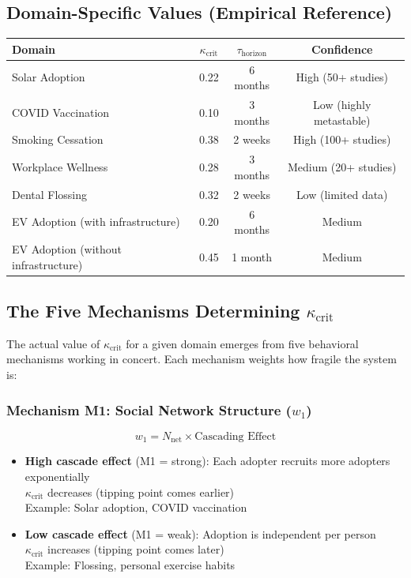 \documentclass[11pt, a4paper]{article}
\begin{document}
\subsection{Domain-Specific Values (Empirical Reference)}

\begin{center}
\begin{tabular}{|l|c|c|c|}
\hline
\textbf{Domain} & $\kappa_{\text{crit}}$ & \textbf{$\tau_{\text{horizon}}$} & \textbf{Confidence} \\
\hline
Solar Adoption & 0.22 & 6 months & High (50+ studies) \\
COVID Vaccination & 0.10 & 3 months & Low (highly metastable) \\
Smoking Cessation & 0.38 & 2 weeks & High (100+ studies) \\
Workplace Wellness & 0.28 & 3 months & Medium (20+ studies) \\
Dental Flossing & 0.32 & 2 weeks & Low (limited data) \\
EV Adoption (with infrastructure) & 0.20 & 6 months & Medium \\
EV Adoption (without infrastructure) & 0.45 & 1 month & Medium \\
\hline
\end{tabular}
\end{center}

\subsection{The Five Mechanisms Determining $\kappa_{\text{crit}}$}

The actual value of $\kappa_{\text{crit}}$ for a given domain emerges from five behavioral
mechanisms working in concert. Each mechanism weights how fragile the system is:

\subsubsection{Mechanism M1: Social Network Structure ($w_1$)}

\begin{equation}
w_1 = N_{\text{net}} \times \text{Cascading Effect}
\end{equation}

\begin{itemize}
    \item \textbf{High cascade effect} (M1 = strong):
    Each adopter recruits more adopters exponentially
    \\ $\kappa_{\text{crit}}$ decreases (tipping point comes earlier)
    \\ Example: Solar adoption, COVID vaccination

    \item \textbf{Low cascade effect} (M1 = weak):
    Adoption is independent per person
    \\ $\kappa_{\text{crit}}$ increases (tipping point comes later)
    \\ Example: Flossing, personal exercise habits
\end{itemize}
\end{document}
